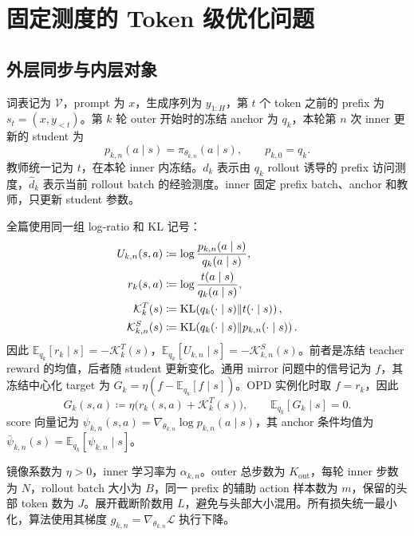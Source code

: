 \chapter{固定测度的 Token 级优化问题}

\section{外层同步与内层对象}

词表记为 $\mathcal V$，prompt 为 $x$，生成序列为 $y_{1:H}$，第 $t$ 个 token 之前的 prefix 为 $s_t=(x,y_{<t})$。第 $k$ 轮 outer 开始时的冻结 anchor 为 $ q_k$，本轮第 $n$ 次 inner 更新的 student 为
\begin{equation}
 p_{k,n}(a\mid s)=\pi_{\theta_{k,n}}(a\mid s),
\qquad  p_{k,0}= q_k.
\end{equation}
教师统一记为 $ t$，在本轮 inner 内冻结。$d_k$ 表示由 $ q_k$ rollout 诱导的 prefix 访问测度，$\widehat d_k$ 表示当前 rollout batch 的经验测度。inner 固定 prefix batch、anchor 和教师，只更新 student 参数。



全篇使用同一组 log-ratio 和 KL 记号：
\begin{align}
U_{k,n}(s,a)&\coloneqq\log\frac{ p_{k,n}(a\mid s)}{ q_k(a\mid s)},\\
r_k(s,a)&\coloneqq\log\frac{ t(a\mid s)}{ q_k(a\mid s)},\\
\mathcal K_k^T(s)&\coloneqq\operatorname{KL}\!\left( q_k(\cdot\mid s)\Vert t(\cdot\mid s)\right),\\
\mathcal K_{k,n}^S(s)&\coloneqq\operatorname{KL}\!\left( q_k(\cdot\mid s)\Vert p_{k,n}(\cdot\mid s)\right).
\end{align}
因此 $\mathbb E_{ q_k}[r_k\mid s]=-\mathcal K_k^T(s)$，$\mathbb E_{ q_k}[U_{k,n}\mid s]=-\mathcal K_{k,n}^S(s)$。前者是冻结 teacher reward 的均值，后者随 student 更新变化。通用 mirror 问题中的信号记为 $f$，其冻结中心化 target 为 $G_k=\eta(f-\mathbb E_{ q_k}[f\mid s])$。OPD 实例化时取 $f=r_k$，因此
\begin{equation}
G_k(s,a)\coloneqq\eta\bigl(r_k(s,a)+\mathcal K_k^T(s)\bigr),
\qquad\mathbb E_{ q_k}[G_k\mid s]=0.
\end{equation}
score 向量记为 $\psi_{k,n}(s,a)=\nabla_{\theta_{k,n}}\log p_{k,n}(a\mid s)$，其 anchor 条件均值为 $\bar\psi_{k,n}(s)=\mathbb E_{ q_k}[\psi_{k,n}\mid s]$。

镜像系数为 $\eta>0$，inner 学习率为 $\alpha_{k,n}$。outer 总步数为 $K_{\mathrm{out}}$，每轮 inner 步数为 $N$，rollout batch 大小为 $B$，同一 prefix 的辅助 action 样本数为 $m$，保留的头部 token 数为 $J$。展开截断阶数用 $L$，避免与头部大小混用。所有损失统一最小化，算法使用其梯度 $g_{k,n}=\nabla_{\theta_{k,n}}\mathcal L$ 执行下降。

